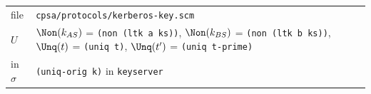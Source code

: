 \par\smallskip\noindent\begin{tabular}{@{}l p{}@{}}
file & \texttt{cpsa/protocols/kerberos-key.scm}\\
$U$ & $\Non(k_{AS})$ = \texttt{(non (ltk a ks))}, $\Non(k_{BS})$ = \texttt{(non (ltk b ks))}, $\Unq(t)$ = \texttt{(uniq t)}, $\Unq(t')$ = \texttt{(uniq t-prime)}\\
in $\sigma$ & \texttt{(uniq-orig k)} in \texttt{keyserver}\\
\end{tabular}

